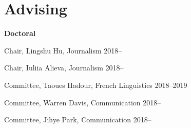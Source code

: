 
\section{Advising}

  \textbf{Doctoral}
    \begin{innerlist}
      \item Chair, Lingshu Hu, Journalism                                       \hfill 2018--\*
      \item Chair, Iuliia Alieva, Journalism                                    \hfill 2018--\*
      \item Committee, Taoues Hadour, French Linguistics                        \hfill 2018--2019
      \item Committee, Warren Davis, Communication                              \hfill 2018--\*
      \item Committee, Jihye Park, Communication                                \hfill 2018--\*
    \end{innerlist}\vspace{1em}

